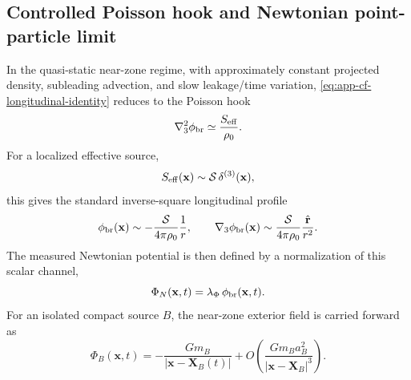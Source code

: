 \documentclass[11pt]{article}
\begin{document}
\subsection{Controlled Poisson hook and Newtonian point-particle limit}
\label{app:carry-forward-poisson-worldtube}

In the quasi-static near-zone regime, with approximately constant projected density,
subleading advection, and slow leakage/time variation, \cref{eq:app-cf-longitudinal-identity}
reduces to the Poisson hook
\begin{equation}
\nabla_3^2\phi_{\rm br}
\simeq
\frac{S_{\rm eff}}{\rho_0}.
\label{eq:app-cf-poisson-hook}
\end{equation}
For a localized effective source,
\begin{equation}
S_{\rm eff}(\mathbf x)\sim \mathcal S\,\delta^{(3)}(\mathbf x),
\label{eq:app-cf-localized-source}
\end{equation}
this gives the standard inverse-square longitudinal profile
\begin{equation}
\phi_{\rm br}(\mathbf x)
\sim
-\frac{\mathcal S}{4\pi\rho_0}\frac{1}{r},
\qquad
\nabla_3\phi_{\rm br}(\mathbf x)
\sim
\frac{\mathcal S}{4\pi\rho_0}\frac{\hat{\mathbf r}}{r^2}.
\label{eq:app-cf-inverse-square}
\end{equation}
The measured Newtonian potential is then defined by a normalization of this scalar
channel,
\begin{equation}
\Phi_N(\mathbf x,t)=\lambda_\Phi\,\phi_{\rm br}(\mathbf x,t).
\label{eq:app-cf-phiN-def}
\end{equation}
For an isolated compact source \(B\), the near-zone exterior field is carried forward as
\begin{equation}
\Phi_B(\mathbf x,t)
=
-\frac{Gm_B}{|\mathbf x-\mathbf X_B(t)|}
+O\!\left(\frac{Gm_B a_B^2}{|\mathbf x-\mathbf X_B|^3}\right).
\label{eq:app-cf-isolated-source-potential}
\end{equation}
\end{document}
